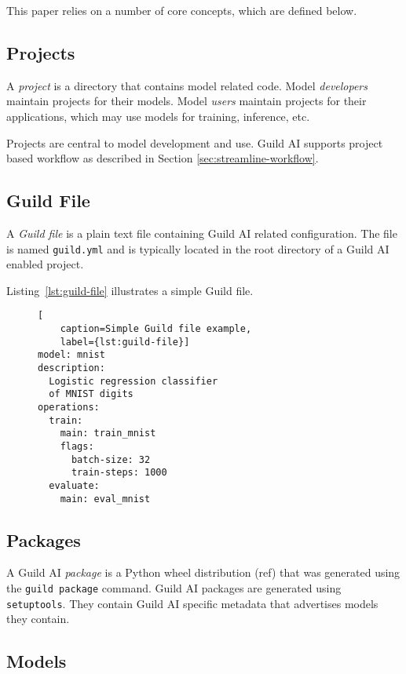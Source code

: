 \documentclass{article}
\begin{document}
This paper relies on a number of core concepts, which are defined
below.

\subsection{Projects}

A \emph{project} is a directory that contains model related
code. Model \emph{developers} maintain projects for their
models. Model \emph{users} maintain projects for their applications,
which may use models for training, inference, etc.

Projects are central to model development and use. Guild AI supports
project based workflow as described in Section
\ref{sec:streamline-workflow}.

\subsection{Guild File}

A \emph{Guild file} is a plain text file containing Guild AI related
configuration. The file is named \verb|guild.yml| and is typically
located in the root directory of a Guild AI enabled project.

Listing~\ref{lst:guild-file} illustrates a simple Guild file.

\begin{figure}
\begin{lstlisting}[
    caption=Simple Guild file example,
    label={lst:guild-file}]
model: mnist
description:
  Logistic regression classifier
  of MNIST digits
operations:
  train:
    main: train_mnist
    flags:
      batch-size: 32
      train-steps: 1000
  evaluate:
    main: eval_mnist
\end{lstlisting}
\end{figure}

\subsection{Packages}

A Guild AI \emph{package} is a Python wheel distribution (ref) that
was generated using the \verb|guild package| command. Guild AI
packages are generated using \verb|setuptools|. They contain Guild AI
specific metadata that advertises models they contain.

\subsection{Models}
\end{document}
